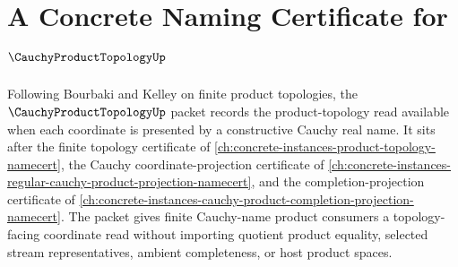\chapter{A Concrete Naming Certificate for $\CauchyProductTopologyUp$}
\label{ch:concrete-instances-cauchy-product-topology-namecert}

Following Bourbaki and Kelley on finite product topologies, the $\CauchyProductTopologyUp$ packet records the product-topology read available when each coordinate is presented by a constructive Cauchy real name. It sits after the finite topology certificate of \autoref{ch:concrete-instances-product-topology-namecert}, the Cauchy coordinate-projection certificate of \autoref{ch:concrete-instances-regular-cauchy-product-projection-namecert}, and the completion-projection certificate of \autoref{ch:concrete-instances-cauchy-product-completion-projection-namecert}. The packet gives finite Cauchy-name product consumers a topology-facing coordinate read without importing quotient product equality, selected stream representatives, ambient completeness, or host product spaces.

